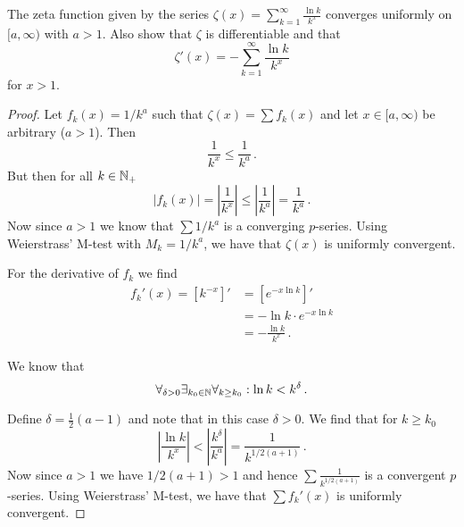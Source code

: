 \documentclass[week=12]{homework}
\date{\today}
\begin{document}
    \maketitle
    \thispagestyle{empty}
    \newpage
    \begin{questions}
		\let\firstquestion\question
		\renewcommand*{\question}{\vspace{7mm}\firstquestion}
        \firstquestion
        \begin{inlinetoprove}
        	The zeta function given by the series $\zeta(x) = \sum_{k=1}^{\infty} \frac{\ln k}{k^x}$ converges uniformly on $[a,\infty)$ with $a > 1$. Also show that $\zeta$ is differentiable and that 
        	\[
        	\zeta'(x) = - \sum_{k=1}^{\infty} \frac{\ln k}{k^x}
        	\]
        	for $x > 1$.
        \end{inlinetoprove}
		
		\begin{proof}
			Let $f_k(x) = 1/k^a$ such that $\zeta(x)  = \sum f_k(x)$ and let $x \in [a,\infty)$ be arbitrary ($a>1$). Then
			\[
				\frac{1}{k^x} \leq \frac{1}{k^a}\,.
			\]
			But then for all $k \in \mathbb{N}_+$
			\[
				\left| f_k(x) \right| = \left| \frac{1}{k^x} \right| \leq \left| \frac{1}{k^a} \right| = \frac{1}{k^a}\,.
			\]
			Now since $a > 1$ we know that $\sum 1/k^a$ is a converging $p$-series. Using Weierstrass' M-test with $M_k = 1/k^a$, we have that $\zeta(x)$ is uniformly convergent.
		
			For the derivative of $f_k$ we find
			\begin{align*}
				f_k'(x) = \left[k^{-x}\right]' &= \left[ e^{-x\ln k} \right]' \\
				&= -\ln k \cdot e^{-x\ln k} \\
				&= -\frac{\ln k}{k^x}\,.
			\end{align*}
			
			We know that
			\[
				\forall_{\delta > 0}\exists_{k_0 \in \mathbb{N}}\forall_{k \geq k_0}: \ln k < k^\delta\,.
			\]
			
			Define $\delta = \frac{1}{2}(a-1)$ and note that in this case $\delta > 0$. We find that for $k \geq k_0$
			\[
				\left| \frac{\ln k}{k^x} \right| < \left| \frac{k^\delta}{k^a} \right| = \frac{1}{k^{1/2(a+1)}}\,.
			\]
			Now since $a > 1$ we have $1/2(a+1) > 1$ and hence $\sum \frac{1}{k^{1/2(a+1)}}$ is a convergent $p$-series. Using Weierstrass' M-test, we have that $\sum f_k'(x)$ is uniformly convergent.
			

\end{proof}
\end{questions}
\end{document}
